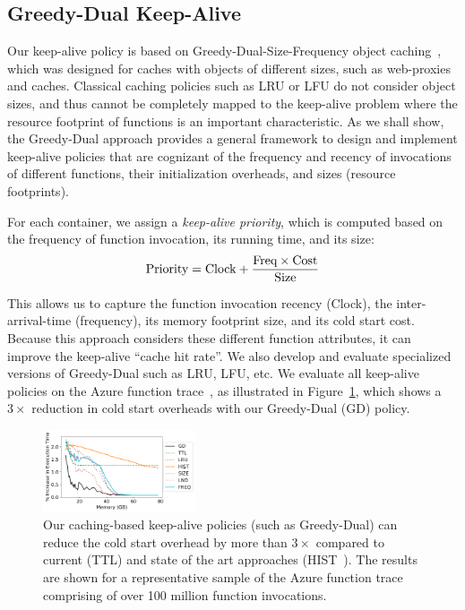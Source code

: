 \documentclass[pageno]{jpaper}
\begin{document}
\subsection{Greedy-Dual Keep-Alive}
\vspace*{\subsecspace}

Our keep-alive policy is based on Greedy-Dual-Size-Frequency object caching~\cite{gdsf}, which was designed for caches with objects of  different sizes, such as web-proxies and caches. 
Classical caching policies such as LRU or LFU do not consider object sizes, and thus cannot be completely mapped to the keep-alive problem where the resource footprint of functions is an important characteristic. 
As we shall show, the Greedy-Dual approach provides a general framework to design and implement keep-alive policies that are cognizant of the  frequency and recency of invocations of different functions, their initialization overheads, and sizes (resource footprints). 

For each container, we assign a \emph{keep-alive priority}, which is computed based on the frequency of function invocation, its running time, and its size:
%
\vspace*{-7pt}
\begin{equation}
  \vspace*{-3pt}
  \text{Priority} = \text{Clock} + \frac{\text{Freq} \times \text{Cost}} {\text{Size}}
    \label{eq:prio-prop}
\end{equation}

This allows us to capture the function invocation recency (Clock), the inter-arrival-time (frequency), its memory footprint size, and its cold start cost. 
Because this approach considers these different function attributes, it can improve the keep-alive ``cache hit rate''.
We also develop and evaluate specialized versions of Greedy-Dual such as LRU, LFU, etc. 
We evaluate all keep-alive policies on the Azure function trace~\cite{shahrad_serverless_2020}, as  illustrated in Figure~\ref{fig:392-b-trace}, which shows a $3\times$ reduction in cold start overheads with our Greedy-Dual (GD) policy. 

\begin{figure}[t]
  \centering
      \vspace*{\myfigspace}
\includegraphics[width=0.4\textwidth]{../graphs/rep-funcs-392/exec_inc_mem-392-legend.pdf}
  \caption{Our caching-based keep-alive policies (such as Greedy-Dual) can reduce the cold start overhead by more than $3\times$ compared to current (TTL) and state of the art approaches (HIST~\cite{shahrad_serverless_2020}). The results are shown for a representative sample of the Azure function trace comprising of over 100 million function invocations.}
  \label{fig:392-b-trace}
\end{figure}
\end{document}
